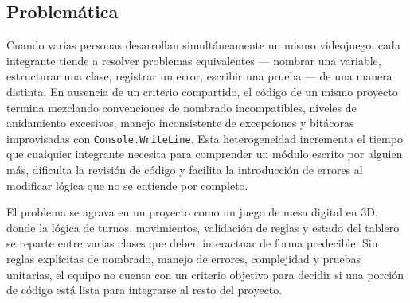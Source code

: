 \subsection{Problemática}

Cuando varias personas desarrollan simultáneamente un mismo videojuego, cada integrante tiende a resolver problemas equivalentes --- nombrar una variable, estructurar una clase, registrar un error, escribir una prueba --- de una manera distinta. En ausencia de un criterio compartido, el código de un mismo proyecto termina mezclando convenciones de nombrado incompatibles, niveles de anidamiento excesivos, manejo inconsistente de excepciones y bitácoras improvisadas con \texttt{Console.WriteLine}. Esta heterogeneidad incrementa el tiempo que cualquier integrante necesita para comprender un módulo escrito por alguien más, dificulta la revisión de código y facilita la introducción de errores al modificar lógica que no se entiende por completo.

El problema se agrava en un proyecto como un juego de mesa digital en 3D, donde la lógica de turnos, movimientos, validación de reglas y estado del tablero se reparte entre varias clases que deben interactuar de forma predecible. Sin reglas explícitas de nombrado, manejo de errores, complejidad y pruebas unitarias, el equipo no cuenta con un criterio objetivo para decidir si una porción de código está lista para integrarse al resto del proyecto.
